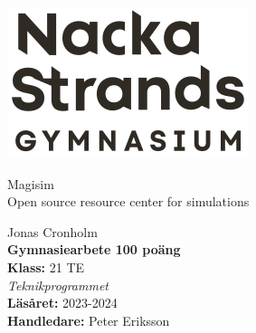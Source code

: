 \documentclass[11pt, a4paper, titlepage]{article}
\begin{document}
\begin{titlepage}
	\noindent
	\includegraphics[width=0.15\paperwidth]{logo-mg.png} %
	
	\vspace*{0.5\paperwidth} %
	\noindent\hspace*{0.15\paperwidth} %
	\begin{minipage}{\textwidth}
		
		\color[HTML]{0b5394}\Huge Magisim\\
		\color{black}\Large Open source resource center for simulations \\
	\end{minipage}
	
	\vfill %
	\noindent
	\begin{minipage}{\textwidth}
		\normalsize %
		Jonas Cronholm \\
		\textbf{Gymnasiearbete 100 poäng} \\
		\textbf{Klass:} 21 TE \\
		\textit{Teknikprogrammet} \\
		\textbf{Läsåret:} 2023-2024 \\
		\textbf{Handledare:} Peter Eriksson
	\end{minipage}
\end{titlepage}

% 
%
\newpage
\
\newpage
\end{document}
